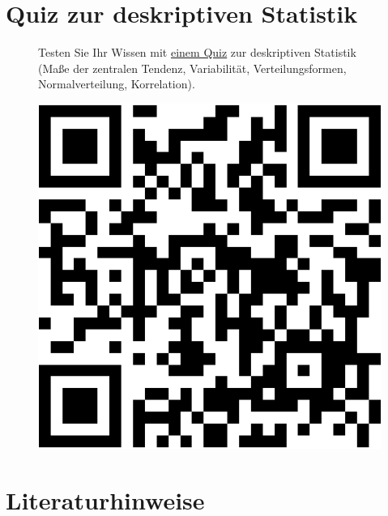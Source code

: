 \documentclass[
  letterpaper,
  oneside,
  open=any]{scrbook}
\theoremstyle{definition}
\theoremstyle{definition}
\theoremstyle{definition}
\theoremstyle{remark}
\begin{document}
\section{Quiz zur deskriptiven
Statistik}\label{quiz-zur-deskriptiven-statistik}

\begin{figure}

\begin{minipage}{0.80\linewidth}
Testen Sie Ihr Wissen mit
\href{https://forms.gle/w7eTW3ftKy8Hv3nw8}{einem Quiz} zur deskriptiven
Statistik (Maße der zentralen Tendenz, Variabilität, Verteilungsformen,
Normalverteilung, Korrelation).\end{minipage}%
%
\begin{minipage}{0.20\linewidth}

\begin{center}
\includegraphics[width=0.75\linewidth,height=\textheight,keepaspectratio]{070-zusammenhaenge_files/figure-pdf/unnamed-chunk-31-1.pdf}
\end{center}

\end{minipage}%

\end{figure}%

\section{Literaturhinweise}\label{literaturhinweise-6}
\end{document}
